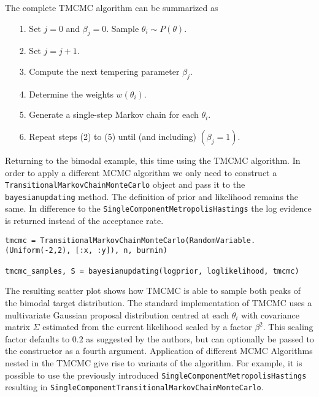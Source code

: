 The complete TMCMC algorithm can be summarized as



\begin{itemize}
\item[1. ] Set \(j=0\) and \(\beta_j=0\). Sample \(\theta_i \sim P(\theta)\).


\item[2. ] Set \(j = j+1\).


\item[3. ] Compute the next tempering parameter \(\beta_j\).


\item[4. ] Determine the weights \(w(\theta_i)\).


\item[5. ] Generate a single-step Markov chain for each \(\theta_i\).


\item[6. ] Repeat steps (2) to (5) until (and including) \((\beta_j=1)\).

\end{itemize}


Returning to the bimodal example, this time using the TMCMC algorithm. In order to apply a different MCMC algorithm we only need to construct a \texttt{TransitionalMarkovChainMonteCarlo} object and pass it to the \texttt{bayesianupdating} method. The definition of prior and likelihood remains the same. In difference to the \texttt{SingleComponentMetropolisHastings} the log evidence is returned instead of the acceptance rate.




\begin{verbatim}
tmcmc = TransitionalMarkovChainMonteCarlo(RandomVariable.(Uniform(-2,2), [:x, :y]), n, burnin)

tmcmc_samples, S = bayesianupdating(logprior, loglikelihood, tmcmc)
\end{verbatim}



\begin{figure}
\centering
\caption{}
\end{figure}




The resulting scatter plot shows how TMCMC is able to sample both peaks of the bimodal target distribution. The standard implementation of TMCMC uses a multivariate Gaussian proposal distribution centred at each \(\theta_i\) with covariance matrix \(\Sigma\) estimated from the current likelihood scaled by a factor \(\beta^2\). This scaling factor defaults to \(0.2\) as suggested by the authors, but can optionally be passed to the constructor as a fourth argument. Application of different MCMC Algorithms nested in the TMCMC give rise to variants of the algorithm. For example, it is possible to use the previously introduced \texttt{SingleComponentMetropolisHastings} resulting in \texttt{SingleComponentTransitionalMarkovChainMonteCarlo}.



